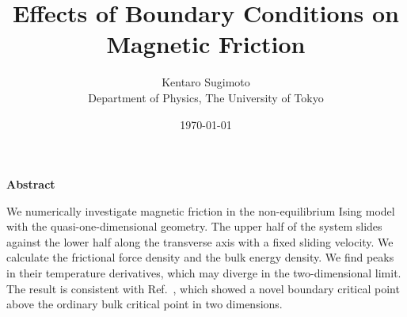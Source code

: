\documentclass[a4,12pt,dvipdfmx]{book}
\theoremstyle{definition}
\newcounter{one}
\begin{document}
\title{Effects of Boundary Conditions on Magnetic Friction}
\author{Kentaro Sugimoto \\ Department of Physics, The University of Tokyo }
\date{\today}
\maketitle

\clearpage
\begin{center}
\large{{\bf Abstract}}
\end{center}
We numerically investigate magnetic friction in the non-equilibrium Ising model with the quasi-one-dimensional geometry. The upper half of the system slides against the lower half along the transverse axis with a fixed sliding velocity. We calculate the frictional force density and the bulk energy density. We find peaks in their temperature derivatives, which may diverge in the two-dimensional limit. The result is consistent with Ref.~\cite{Hucht2009b}, which showed a novel boundary critical point above the ordinary bulk critical point in two dimensions.
\tableofcontents



%
%


\appendix

%
%
\printbibliography
\end{document}
